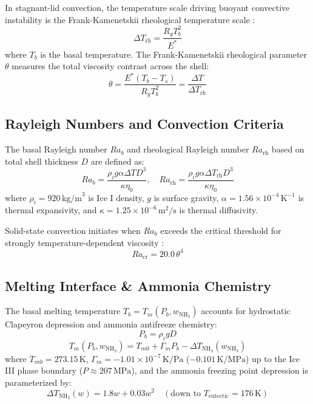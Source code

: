 \documentclass[10pt,twocolumn,letterpaper]{article}
\begin{document}
In stagnant-lid convection, the temperature scale driving buoyant convective instability is the Frank-Kamenetskii rheological temperature scale \cite{solomatov1995scaling,spohn2003oceans}:
\begin{equation}
\Delta T_{\mathrm{rh}} = \frac{R_g T_b^2}{E^*}
\label{eq:delta_trh}
\end{equation}
where $T_b$ is the basal temperature. The Frank-Kamenetskii rheological parameter $\theta$ measures the total viscosity contrast across the shell:
\begin{equation}
\theta = \frac{E^* (T_b - T_s)}{R_g T_b^2} = \frac{\Delta T}{\Delta T_{\mathrm{rh}}}
\label{eq:theta}
\end{equation}

\subsection{Rayleigh Numbers and Convection Criteria}
The basal Rayleigh number $Ra_b$ and rheological Rayleigh number $Ra_{\mathrm{rh}}$ based on total shell thickness $D$ are defined as:
\begin{equation}
Ra_b = \frac{\rho_i g \alpha \Delta T D^3}{\kappa \eta_0}, \quad Ra_{\mathrm{rh}} = \frac{\rho_i g \alpha \Delta T_{\mathrm{rh}} D^3}{\kappa \eta_0}
\label{eq:rayleigh}
\end{equation}
where $\rho_i = 920\,\text{kg/m}^3$ is Ice I density, $g$ is surface gravity, $\alpha = 1.56\times 10^{-4}\,\text{K}^{-1}$ is thermal expansivity, and $\kappa = 1.25\times 10^{-6}\,\text{m}^2/\text{s}$ is thermal diffusivity.

Solid-state convection initiates when $Ra_b$ exceeds the critical threshold for strongly temperature-dependent viscosity \cite{solomatov1995scaling}:
\begin{equation}
Ra_{\mathrm{cr}} = 20.0\,\theta^4
\label{eq:ra_crit}
\end{equation}

\subsection{Melting Interface \& Ammonia Chemistry}
The basal melting temperature $T_b = T_m(P_b, w_{\mathrm{NH}_3})$ accounts for hydrostatic Clapeyron depression and ammonia antifreeze chemistry:
\begin{equation}
P_b = \rho_i g D
\label{eq:pressure}
\end{equation}
\begin{equation}
T_m(P_b, w_{\mathrm{NH}_3}) = T_{m0} + \Gamma_m P_b - \Delta T_{\mathrm{NH}_3}(w_{\mathrm{NH}_3})
\label{eq:melting}
\end{equation}
where $T_{m0} = 273.15\,\text{K}$, $\Gamma_m = -1.01\times 10^{-7}\,\text{K/Pa}$ ($-0.101\,\text{K/MPa}$) up to the Ice III phase boundary ($P \approx 207\,\text{MPa}$), and the ammonia freezing point depression is parameterized by:
\begin{equation}
\Delta T_{\mathrm{NH}_3}(w) = 1.8 w + 0.03 w^2 \quad (\text{down to } T_{\mathrm{eutectic}} = 176\,\text{K})
\label{eq:nh3}
\end{equation}
\end{document}
